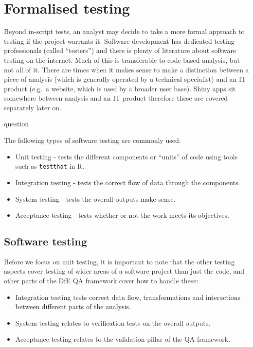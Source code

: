 \documentclass[
]{book}
\providecommand{\tightlist}{%
  \setlength{\itemsep}{0pt}\setlength{\parskip}{0pt}}
\begin{document}
\hypertarget{formalised-testing}{%
\section{Formalised testing}\label{formalised-testing}}

Beyond in-script tests, an analyst may decide to take a more formal approach to testing if the project warrants it. Software development has dedicated testing professionals (called ``testers'') and there is plenty of literature about software testing on the internet. Much of this is transferable to code based analysis, but not all of it. There are times when it makes sense to make a distinction between a piece of analysis (which is generally operated by a technical specialist) and an IT product (e.g.~a website, which is used by a broader user base). Shiny apps sit somewhere between analysis and an IT product therefore these are covered separately later on.

\begin{infoboxyellow}question

The following types of software testing are commonly used:

\begin{itemize}
\tightlist
\item
  Unit testing - tests the different components or ``units'' of code using tools such as \texttt{testthat} in R.
\item
  Integration testing - tests the correct flow of data through the components.
\item
  System testing - tests the overall outputs make sense.
\item
  Acceptance testing - tests whether or not the work meets its objectives.
\end{itemize}

\end{infoboxyellow}

\hypertarget{software-testing}{%
\subsection{Software testing}\label{software-testing}}

Before we focus on unit testing, it is important to note that the other testing aspects cover testing of wider areas of a software project than just the code, and other parts of the DfE QA framework cover how to handle these:

\begin{itemize}
\tightlist
\item
  Integration testing tests correct data flow, transformations and interactions between different parts of the analysis.
\item
  System testing relates to verification tests on the overall outputs.
\item
  Acceptance testing relates to the validation pillar of the QA framework.
\end{itemize}
\end{document}
